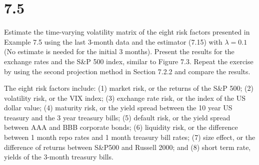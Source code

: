 \documentclass[11pt,]{article}
\renewenvironment{quote}{\begin{shaded*}}{\end{shaded*}}
\begin{document}
\hypertarget{section-3}{%
\section{7.5}\label{section-3}}

Estimate the time-varying volatility matrix of the eight risk factors
presented in Example 7.5 using the last 3-month data and the estimator
(7.15) with \(\lambda =0.1\) (No estimate is needed for the initial 3
months). Present the results for the exchange rates and the S\&P 500
index, similar to Figure 7.3. Repeat the exercise by using the second
projection method in Section 7.2.2 and compare the results.

\begin{quote}
The eight risk factors include: (1) market risk, or the returns of the
S\&P 500; (2) volatility risk, or the VIX index; (3) exchange rate risk,
or the index of the US dollar value; (4) maturity risk, or the yield
spread between the 10 year US treasury and the 3 year treasury bills;
(5) default risk, or the yield spread between AAA and BBB corporate
bonds; (6) liquidity risk, or the difference between 1 month repo rates
and 1 month treasury bill rates; (7) size effect, or the difference of
returns between S\&P500 and Russell 2000; and (8) short term rate,
yields of the 3-month treasury bills.
\end{quote}
\end{document}
